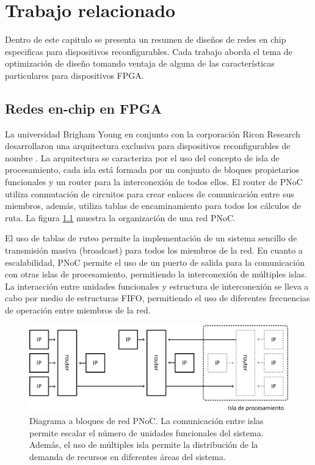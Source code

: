 \chapter{Trabajo relacionado}\label{chap:trabajo_relacionado}

Dentro de este capitulo se presenta un resumen de diseños de redes en chip especificas para dispositivos reconfigurables. Cada trabajo aborda el tema de optimización de diseño tomando ventaja de alguna de las características particulares para dispositivos FPGA.

\section{Redes en-chip en FPGA}\label{sec:redes_en_chip_en_fpga}

La universidad Brigham Young en conjunto con la corporación Ricon Research desarrollaron una arquitectura exclusiva para dispositivos reconfigurables de nombre \cite{chapter3:1515721, chapter3:1626510}. La arquitectura se caracteriza por el uso del concepto de isla de procesamiento, cada isla está formada por un conjunto de bloques propietarios funcionales y un router para la interconexión de todos ellos. El router de PNoC utiliza conmutación de circuitos para crear enlaces de comunicación entre sus miembros, además, utiliza tablas de encaminamiento para todos los cálculos de ruta. La figura \ref{fig:ch3_pnoc} muestra la organización de una red PNoC.

El uso de tablas de ruteo permite la implementación de un sistema sencillo de transmisión masiva (broadcast) para todos los miembros de la red. En cuanto a escalabilidad, PNoC permite el uso de un puerto de salida para la comunicación con otras islas de procesamiento, permitiendo la interconexión de múltiples islas. La interacción entre unidades funcionales y estructura de interconexión se lleva a cabo por medio de estructuras FIFO, permitiendo el uso de diferentes frecuencias de operación entre miembros de la red.

\begin{figure}
	\begin{center}
		\includegraphics[scale=0.6]{figures/ch3_pnoc.png}
	\end{center}
	\caption
		{	
			Diagrama a bloques de red PNoC. La comunicación entre islas permite escalar el número de unidades funcionales del sistema. Además, el uso de múltiples isla permite la distribución de la demanda de recursos en diferentes áreas del sistema.
		}
	\label{fig:ch3_pnoc}
\end{figure}


